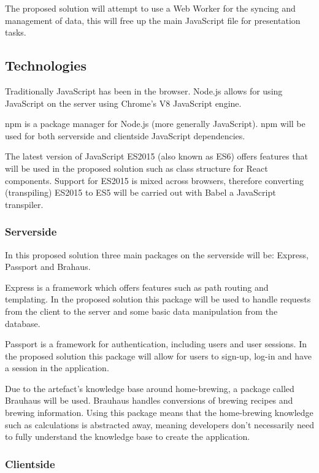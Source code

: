 The proposed solution will attempt to use a Web Worker for the syncing and management of data, this will free up the main JavaScript file for presentation tasks.

\subsection{Technologies} \label{a-d--technologies}

Traditionally JavaScript has been in the browser. Node.js allows for using JavaScript on the server using Chrome's V8 JavaScript engine. \cite{node.js}

npm is a package manager for Node.js (more generally JavaScript). npm will be used for both serverside and clientside JavaScript dependencies.

The latest version of JavaScript ES2015 (also known as ES6) offers features that will be used in the proposed solution such as class structure for React components. Support for ES2015 is mixed across browsers, therefore converting (transpiling) ES2015 to ES5 will be carried out with Babel a JavaScript transpiler. \cite{babel}

\subsubsection{Serverside} \label{a-d--t--serverside}

In this proposed solution three main packages on the serverside will be: Express, Passport and Brahaus. \cite{npm}

Express is a framework which offers features such as path routing and templating. In the proposed solution this package will be used to handle requests from the client to the server and some basic data manipulation from the database. \cite{express}

Passport is a framework for authentication, including users and user sessions. In the proposed solution this package will allow for users to sign-up, log-in and have a session in the application. \cite{passport}

Due to the artefact's knowledge base around home-brewing, a package called Brauhaus will be used. Brauhaus handles conversions of brewing recipes and brewing information. Using this package means that the home-brewing knowledge such as calculations is abstracted away, meaning developers don't necessarily need to fully understand the knowledge base to create the application. \cite{brauhaus.js}

\subsubsection{Clientside} \label{a-d--t--clientside}

